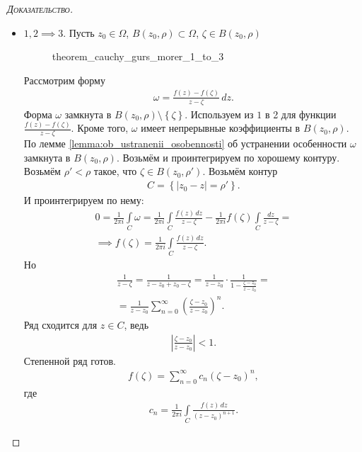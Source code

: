 \documentclass[../../main.tex]{subfiles}
\begin{document}
\begin{proof}[\normalfont\textsc{Доказательство}]
\begin{itemize}
\item $1,2 \implies 3$. Пусть $z_0 \in \Omega$, $B(z_0, \rho) \subset \Omega$, $\zeta \in B(z_0, \rho)$
\begin{figure}[ht]
    \centering
    \caption{theorem_cauchy_gurs_morer_1_to_3}
    \label{fig:theorem_cauchy_gurs_morer_1_to_3}
\end{figure}

 Рассмотрим форму
 \begin{align*}
  \omega = \frac{f(z) - f(\zeta)}{z-\zeta}\,dz.
 \end{align*} Форма $\omega$ замкнута в $B(z_0, \rho) \setminus \left\{ \zeta \right\}$. Используем из $1$ в 2 для функции $\frac{f(z) - f(\zeta)}{z-\zeta}$. Кроме того, $\omega$ имеет непрерывные коэффициенты в $B(z_0, \rho)$. По лемме \ref{lemma:ob_ustranenii_osobennosti} об устранении особенности $\omega$ замкнута в $B(z_0, \rho)$. Возьмём и проинтегрируем по хорошему контуру. Возьмём $\rho' < \rho$ такое, что $\zeta \in B(z_0, \rho')$. Возьмём контур
 \begin{align*}
  C = \left\{ \left| z_0 - z \right| = \rho' \right\}.
 \end{align*} И проинтегрируем по нему:
 \begin{align*}
  0=\frac{1}{2\pi i} \int\limits_{C} \omega  = \frac{1}{2\pi i} \int\limits_{C} \frac{f(z)\,dz}{z - \zeta}  - \frac{1}{2\pi i} f(\zeta) \int\limits_{C} \frac{dz}{z - \zeta} = \\
  \implies f(\zeta) = \frac{1}{2\pi i} \int\limits_{C} \frac{f(z)\,dz}{z - \zeta}.
 \end{align*} Но
 \begin{align*}
  \frac{1}{z - \zeta} = \frac{1}{z - z_0 + z_0 - \zeta} = \frac{1}{z - z_0} \cdot \frac{1}{1 -  \frac{\zeta - z_0}{z - z_0}} = \\
  = \frac{1}{z-z_0} \sum_{n=0}^{\infty} \left( \frac{\zeta-z_0}{z-z_0} \right)^{n}.
 \end{align*} Ряд сходится для $z \in C$, ведь
 \begin{align*}
  \left| \frac{\zeta - z_0}{z-z_0} \right| < 1.
 \end{align*}
 Степенной ряд готов.
 \begin{align*}
  f(\zeta) = \sum_{n=0}^{\infty} c_n \left( \zeta - z_0 \right)^{n},
 \end{align*} где
 \begin{align*}
  c_n = \frac{1}{2\pi i} \int\limits_{C} \frac{f(z)\,dz}{(z - z_0)^{n + 1}}.
 \end{align*} 


\end{itemize}
\end{proof}
\end{document}
